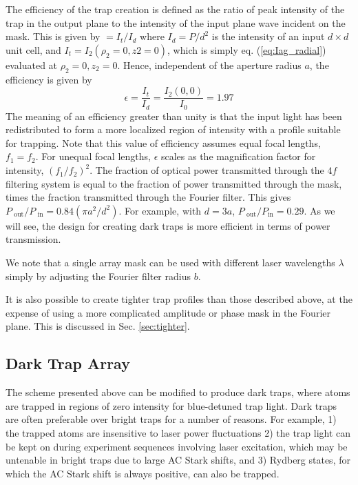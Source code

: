 The efficiency of the trap creation is defined as the ratio of peak intensity of the trap in the output plane to the intensity of the input plane wave incident on the mask. This is given by $=I_{t}/I_{d}$ where $I_{d} = P / d^{2}$ is the intensity of an input $d \times d$ unit cell, and $I_{t} = I_2(\rho_2=0,z2=0)$, which is simply  eq. (\ref{eq:Iag_radial}) evaluated at $\rho_2=0,z_2=0$. Hence, independent of the aperture radius $a$, the efficiency is given by
\begin{equation}\label{eq:brighteff}
    \epsilon = \frac{I_{t}}{I_{d}} = \frac{I_{2}\left(0,0\right)}{I_{0}}=1.97
\end{equation}
The meaning of an efficiency greater than unity is that the input light has been redistributed to form a more localized region of intensity with a profile suitable for trapping. Note that this value of efficiency assumes equal focal lengths, $f_1=f_2$. For unequal focal lengths, $\epsilon$ scales as the magnification factor for intensity, $(f_1/f_2)^2$. 
The fraction of optical power transmitted through the $4f$ filtering system is equal to the fraction of power transmitted through the mask, times the fraction transmitted through the Fourier filter. This gives $ P_{\text{ out}}/P_{\text{ in}}= 0.84(\pi a^2/d^2)$. For example, with $d=3a$, $P_{\text{ out}}/P_{\text {in}}=0.29$. As we will see, the design for creating dark traps is  more efficient in terms of power transmission.

We note that a single array mask can be used with different laser wavelengths $\lambda$ simply by adjusting the Fourier filter radius $b$.

It is also possible to create tighter trap profiles than those described above, at the expense of using a  more complicated amplitude or phase mask in the Fourier plane\cite{Beguin2020}. This is discussed in Sec. \ref{sec:tighter}.

\subsection{Dark Trap Array}
The scheme presented above can be modified to produce dark traps, where atoms are trapped in regions of zero intensity for blue-detuned trap light. Dark traps are often preferable over bright traps for a number of reasons. For example, 1) the trapped atoms are insensitive to laser power fluctuations 2) the trap light can be kept on during experiment sequences involving laser excitation, which may be untenable in bright traps due to large AC Stark shifts, and 3) Rydberg states, for which the AC Stark shift is always positive, can also be trapped\cite{SZhang2011}.


